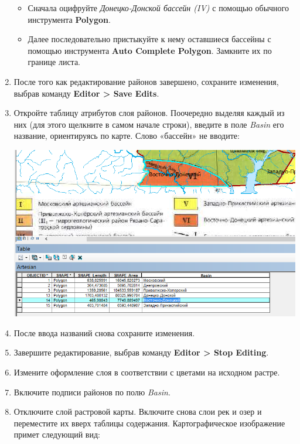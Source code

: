 \documentclass[]{book}
\theoremstyle{definition}
\theoremstyle{definition}
\theoremstyle{definition}
\theoremstyle{remark}
\begin{document}
\begin{enumerate}
  \begin{itemize}
  \item
    Сначала оцифруйте \emph{Донецко-Донской бассейн (IV)} с помощью
    обычного инструмента \textbf{Polygon}.
  \item
    Далее последовательно пристыкуйте к нему оставшиеся бассейны с
    помощью инструмента \textbf{Auto Complete Polygon}. Замкните их по
    границе листа.
  \end{itemize}
\item
  После того как редактирование районов завершено, сохраните изменения,
  выбрав команду \textbf{Editor \textgreater{} Save Edits}.
\item
  Откройте таблицу атрибутов слоя районов. Поочередно выделяя каждый из
  них (для этого щелкните в самом начале строки), введите в поле
  \emph{Basin} его название, ориентируясь по карте. Слово «бассейн» не
  вводите:

  \includegraphics{images/Ex06/image13.png}
\item
  После ввода названий снова сохраните изменения.
\item
  Завершите редактирование, выбрав команду \textbf{Editor \textgreater{}
  Stop Editing}.
\item
  Измените оформление слоя в соответствии с цветами на исходном растре.
\item
  Включите подписи районов по полю \emph{Basin}.
\item
  Отключите слой растровой карты. Включите снова слои рек и озер и
  переместите их вверх таблицы содержания. Картографическое изображение
  примет следующий вид:


\end{enumerate}
\end{document}

